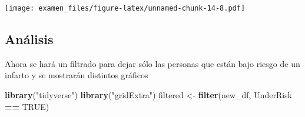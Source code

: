 \documentclass[
  10pt,
  spanish,
]{article}
\newenvironment{Shaded}{\begin{snugshade}}{\end{snugshade}}
\newcommand{\KeywordTok}[1]{\textcolor[rgb]{0.13,0.29,0.53}{\textbf{#1}}}
\newcommand{\NormalTok}[1]{#1}
\newcommand{\OperatorTok}[1]{\textcolor[rgb]{0.81,0.36,0.00}{\textbf{#1}}}
\newcommand{\OtherTok}[1]{\textcolor[rgb]{0.56,0.35,0.01}{#1}}
\newcommand{\StringTok}[1]{\textcolor[rgb]{0.31,0.60,0.02}{#1}}
\begin{document}
\texttt{[image: examen\_files/figure-latex/unnamed-chunk-14-8.pdf]}

\hypertarget{anuxe1lisis}{%
\subsection{Análisis}\label{anuxe1lisis}}

Ahora se hará un filtrado para dejar sólo las personas que están bajo
riesgo de un infarto y se mostrarán distintos gráficos

\begin{Shaded}
\begin{Highlighting}[]
\KeywordTok{library}\NormalTok{(}\StringTok{"tidyverse"}\NormalTok{)}
\KeywordTok{library}\NormalTok{(}\StringTok{"gridExtra"}\NormalTok{)}
\NormalTok{filtered \textless{}{-}}\StringTok{ }\KeywordTok{filter}\NormalTok{(new\_df, UnderRisk }\OperatorTok{==}\StringTok{ }\OtherTok{TRUE}\NormalTok{)}



\end{Highlighting}
\end{Shaded}
\end{document}
